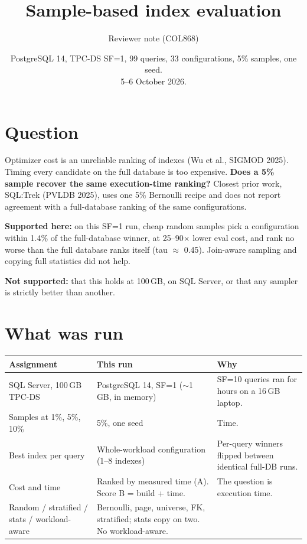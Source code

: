 \documentclass[11pt,a4paper]{article}
\title{\vspace{-12mm}Sample-based index evaluation}
\author{Reviewer note (COL868)}
\date{PostgreSQL 14, TPC-DS SF=1, 99 queries, 33 configurations, 5\% samples, one seed.\\
5--6 October 2026.}
\begin{document}
\maketitle
\vspace{-10mm}

\section{Question}

Optimizer cost is an unreliable ranking of indexes (Wu et al., SIGMOD 2025). Timing every candidate on the full database is too expensive. \textbf{Does a 5\% sample recover the same execution-time ranking?} Closest prior work, SQL:Trek (PVLDB 2025), uses one 5\% Bernoulli recipe and does not report agreement with a full-database ranking of the same configurations.

\textbf{Supported here:} on this SF=1 run, cheap random samples pick a configuration within 1.4\% of the full-database winner, at 25--90$\times$ lower eval cost, and rank no worse than the full database ranks itself (tau $\approx$ 0.45). Join-aware sampling and copying full statistics did not help.

\textbf{Not supported:} that this holds at 100\,GB, on SQL Server, or that any sampler is strictly better than another.

\section{What was run}

{\small
\begin{tabularx}{\textwidth}{@{}p{}p{}L@{}}
\toprule
Assignment & This run & Why \\
\midrule
SQL Server, 100\,GB TPC-DS & PostgreSQL 14, SF=1 ($\sim$1\,GB, in memory) & SF=10 queries ran for hours on a 16\,GB laptop. \\
Samples at 1\%, 5\%, 10\% & 5\%, one seed & Time. \\
Best index per query & Whole-workload configuration (1--8 indexes) & Per-query winners flipped between identical full-DB runs. \\
Cost and time & Ranked by measured time (A). Score B = build + time. & The question is execution time. \\
Random / stratified / stats / workload-aware & Bernoulli, page, universe, FK, stratified; stats copy on two. No workload-aware. & \\
\bottomrule
\end{tabularx}
}
\end{document}
